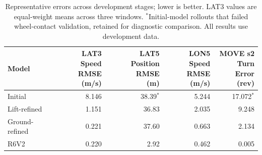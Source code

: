 \begin{table}[!t]
\centering\small
\setlength{\tabcolsep}{6pt}
\begin{tabular}{@{}lrrrr@{}}
\toprule
Model & \shortstack{LAT3\\Speed RMSE\\(m/s)} & \shortstack{LAT5\\Position RMSE\\(m)} & \shortstack{LON5\\Speed RMSE\\(m/s)} & \shortstack{MOVE s2\\Turn Error\\(rev)} \\
\midrule
Initial & 8.146 & 38.39$^{*}$ & 5.244 & 17.072$^{*}$ \\
Lift-refined & 1.151 & 36.83 & 2.035 & 9.248 \\
Ground-refined & 0.221 & 37.60 & 0.663 & 2.134 \\
R6V2 & 0.220 & 2.92 & 0.462 & 0.005 \\
\bottomrule
\end{tabular}
\caption{Representative errors across development stages; lower is better. LAT3 values are equal-weight means across three windows. $^{*}$Initial-model rollouts that failed wheel-contact validation, retained for diagnostic comparison. All results use development data.}
\label{tab:stage_summary}
\end{table}
